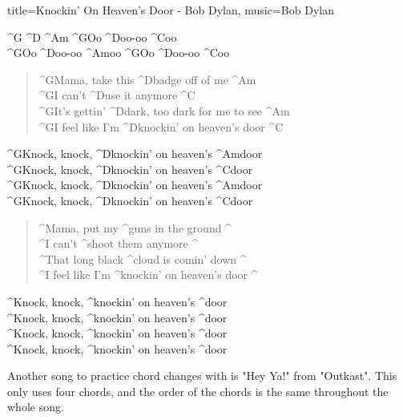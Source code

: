 \begin{song}[verse/numbered, remember-chords, align-chords=l]{title={Knockin' On Heaven's Door - Bob Dylan}, music={Bob Dylan}}
	\begin{intro}	
		^{G}   ^{D}      ^{Am}     ^{G}Oo ^{D}oo-oo ^{C}oo \\
		^{G}Oo ^{D}oo-oo ^{Am}oo   ^{G}Oo ^{D}oo-oo ^{C}oo \\
	\end{intro}
	\begin{verse}
		^{G}Mama, take this ^{D}badge off of me ^{Am} \\
		^{G}I can’t ^{D}use it anymore ^{C} \\
		^{G}It’s gettin’ ^{D}dark, too dark for me to see ^{Am} \\
		^{G}I feel like I’m ^{D}knockin’ on heaven’s door ^{C} \\
	\end{verse}
	\begin{chorus}
		^{G}Knock, knock, ^{D}knockin’ on heaven’s ^{Am}door \\
		^{G}Knock, knock, ^{D}knockin’ on heaven’s ^{C}door \\
		^{G}Knock, knock, ^{D}knockin’ on heaven’s ^{Am}door \\
		^{G}Knock, knock, ^{D}knockin’ on heaven’s ^{C}door \\
	\end{chorus}
	\begin{verse}
		^Mama, put my ^guns in the ground ^ {} \\
		^I can’t ^shoot them anymore ^ {} \\
		^That long black ^cloud is comin’ down ^ {} \\
		^I feel like I’m ^knockin’ on heaven’s door ^ {} \\
	\end{verse}
	\begin{chorus}
		^Knock, knock, ^knockin’ on heaven’s ^door \\
		^Knock, knock, ^knockin’ on heaven’s ^door \\
		^Knock, knock, ^knockin’ on heaven’s ^door \\
		^Knock, knock, ^knockin’ on heaven’s ^door \\
	\end{chorus}
\end{song}

\newpage

Another song to practice chord changes with is "Hey Ya!" from "Outkast". This only uses four chords, and the order of the chords is the same throughout the whole song.

